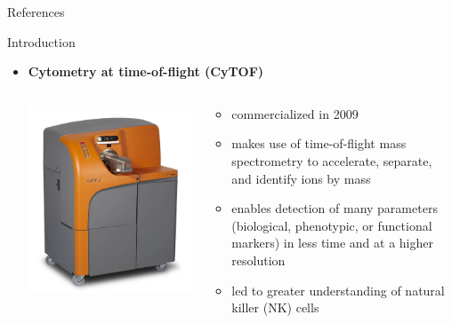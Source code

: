 \documentclass[ignorenonframetext,]{beamer}
\newif\ifbibliography
\begin{document}
\appendix
\begin{frame}[allowframebreaks]{References}
\bibliographytrue

\end{frame}

\begin{frame}{Introduction}
\begin{itemize}
\item
  \textbf{Cytometry at time-of-flight (CyTOF)} \setlength\itemsep{1em}
  \begin{minipage}{\textwidth}
  \begin{columns}[T]
  \begin{column}{0.1\textwidth}
  \vspace{5em}
  \includegraphics[scale=0.5]{img/CyTOF_instrument.jpg}
  \end{column}
  \begin{column}{0.6\textwidth}
  \begin{itemize}
  \item
  commercialized in 2009
  \item 
  makes use of time-of-flight mass spectrometry to accelerate, separate, and
  identify ions by mass
  \item
  enables detection of many parameters (biological, phenotypic, or functional
  markers) in less time and at a higher resolution \citep{cheung2011screening}
  \item 
  led to greater understanding of natural killer (NK) cells
  \end{itemize}
  \end{column}
  \end{columns}
  \end{minipage}
\end{itemize}
\end{frame}
\end{document}
